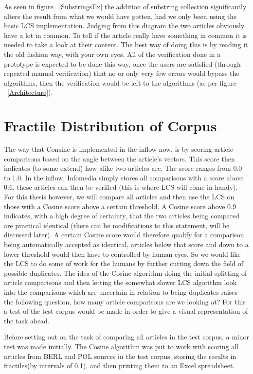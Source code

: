 As seen in figure ~\ref{SubstringsEx} the addition of substring collection significantly alters the result from what we would have gotten, had we only been using the basic LCS implementation. Judging from this diagram the two articles obviously have a lot in common. To tell if the article really have something in common it is needed to take a look at their content. The best way of doing this is by reading it the old fashion way, with your own eyes.  All of the verification done in a prototype is expected to be done this way, once the users are satisfied (through repeated manual verification) that no or only very few errors would bypass the algorithms, then the verification would be left to the algorithms (as per figure ~\ref{Architecture}).

\section{Fractile Distribution of Corpus}
The way that Consine is implemented in the inflow now, is by scoring article comparisons based on the angle between the article's vectors. This score then indicates (to some extend) how alike two articles are. The score ranges from 0.0 to 1.0. In the inflow, Infomedia simply stores all comparisons with a score above 0.6, these articles can then be verified (this is where LCS will come in handy). For this thesis however, we will compare all articles and then use the LCS on those with a Cosine score above a certain threshold. A Cosine score above 0.9 indicates, with a high degree of certainty, that the two articles being compared are practical identical (there can be modifications to this statement, will be discussed later). A certain Cosine score would therefore qualify for a comparison being automatically accepted as identical, articles below that score and down to a lower threshold would then have to controlled by human eyes. So we would like the LCS to do some of work for the humans by further cutting down the field of possible duplicates. The idea of the Cosine algorithm doing the initial splitting of article comparisons and then letting the somewhat slower LCS algorithm look into the comparisons which are uncertain in relation to being duplicates raises the following question, how many article comparisons are we looking at? For this a test of the test corpus would be made in order to give a visual representation of the task ahead.

Before setting out on the task of comparing all articles in the test corpus, a minor test was made initially. The Cosine algorithm was put to work with scoring all articles from BERL and POL sources in the test corpus, storing the results in fractiles(by intervals of 0.1), and then printing them to an Excel spreadsheet.

